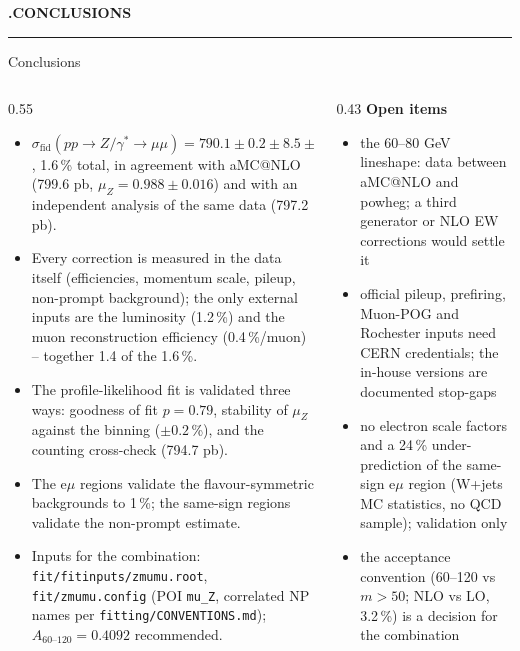 \documentclass[aspectratio=169,9pt,t]{beamer}
\newcounter{divider}
\newcommand{\divider}[1]{\stepcounter{divider}\begin{frame}[plain]\vfill\centering
  {\color{primary}\bfseries\Large\MakeTextUppercase{\thedivider.\quad #1}}\\[0.35cm]{\color{rule}\rule{0.3\textwidth}{0.5pt}}\vfill\end{frame}}
\newcommand{\pb}{\,\mathrm{pb}}
\newcommand{\muZ}{\mu_{Z}}
\newcommand{\sfid}{\sigma_{\mathrm{fid}}}
\begin{document}
\divider{Conclusions}

\begin{frame}{Conclusions}
  \begin{columns}[T]
    \begin{column}{0.55\textwidth}\footnotesize
      \begin{itemize}\setlength\itemsep{0.4em}
        \item {\color{secondary}$\sfid(pp\to Z/\gamma^*\to\mu\mu) = 790.1 \pm 0.2 \pm 8.5 \pm 9.6\pb$}, 1.6\,\% total, in agreement with aMC@NLO (799.6 pb, $\muZ = 0.988 \pm 0.016$) and with an independent analysis of the same data (797.2 pb).
        \item Every correction is measured in the data itself (efficiencies, momentum scale, pileup, non-prompt background); the only external inputs are the luminosity (1.2\,\%) and the muon reconstruction efficiency (0.4\,\%/muon) -- together 1.4 of the 1.6\,\%.
        \item The profile-likelihood fit is validated three ways: goodness of fit $p = 0.79$, stability of $\muZ$ against the binning ($\pm 0.2$\,\%), and the counting cross-check (794.7 pb).
        \item The e$\mu$ regions validate the flavour-symmetric backgrounds to 1\,\%; the same-sign regions validate the non-prompt estimate.
        \item Inputs for the combination: \texttt{fit/fitinputs/zmumu.root}, \texttt{fit/zmumu.config} (POI \texttt{mu\_Z}, correlated NP names per \texttt{fitting/CONVENTIONS.md}); $A_{60\text{--}120} = 0.4092$ recommended.
      \end{itemize}
    \end{column}
    \begin{column}{0.43\textwidth}\footnotesize
      \textbf{\color{primary}Open items}
      \begin{itemize}\setlength\itemsep{0.35em}
        \item the 60--80 GeV lineshape: data between aMC@NLO and powheg; a third generator or NLO EW corrections would settle it
        \item official pileup, prefiring, Muon-POG and Rochester inputs need CERN credentials; the in-house versions are documented stop-gaps
        \item no electron scale factors and a 24\,\% under-prediction of the same-sign e$\mu$ region (W+jets MC statistics, no QCD sample); validation only
        \item the acceptance convention (60--120 vs $m > 50$; NLO vs LO, 3.2\,\%) is a decision for the combination
      \end{itemize}
    \end{column}
  \end{columns}
\end{frame}
\end{document}
